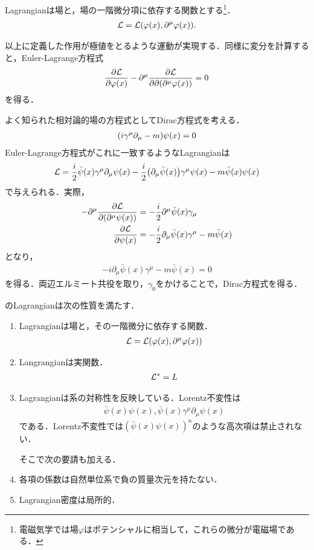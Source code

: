 	Lagrangianは場と，場の一階微分項に依存する関数とする\footnote{電磁気学では場$\varphi$はポテンシャルに相当して，これらの微分が電磁場である．}．
	\begin{align}
			\mathcal{L} = \mathcal{L}(\varphi(x), \partial^{\mu}\varphi(x)).
	\end{align}

	以上に定義した作用が極値をとるような運動が実現する．同様に変分を計算すると，Euler-Lagrange方程式
	\begin{align}
			\pdv{\mathcal{L}}{\varphi(x)} - \partial^{\mu}\pdv{\mathcal{L}}{\partial (\partial^{\mu}\varphi(x))} = 0
	\end{align}
	を得る．
	\begin{eg}[Dirac方程式]
			よく知られた相対論的場の方程式としてDirac方程式を考える．
			\begin{align}
			\qty(i\gamma^{\mu}\partial_{\mu} - m)\psi(x) = 0
			\end{align}
			Euler-Lagrange方程式がこれに一致するようなLagrangianは
			\begin{align}
					\mathcal{L} = \frac{i}{2}\bar{\psi}(x)\gamma^{\mu}\partial_{\mu}\psi(x) - \frac{i}{2}\qty(\partial_{\mu}\bar{\psi}(x))\gamma^{\mu}\psi(x) - m\bar{\psi}(x)\psi(x) \label{Dirac_L}
			\end{align}
			で与えられる．実際，
			\begin{align}
					-\partial ^{\mu}\pdv{\mathcal{L}}{(\partial^{\mu}\psi(x))} &= -\frac{i}{2}\partial^{\mu}\bar{\psi}(x)\gamma_{\mu}\\
					\pdv{\mathcal{L}}{\psi(x)} &= -\frac{i}{2}\partial_{\mu}\bar{\psi}(x)\gamma^{\mu} - m\bar{\psi}(x)
			\end{align}
			となり，
			\begin{align}
					-i\partial_{\mu}\bar{\psi}(x)\gamma^{\mu} - m \bar{\psi}(x) = 0
			\end{align}
			を得る．両辺エルミート共役を取り，$\gamma_0$をかけることで，Dirac方程式を得る．

			のLagrangianは次の性質を満たす．
			\begin{enumerate}
					\item Lagrangianは場と，その一階微分に依存する関数．
							\begin{align}
									\mathcal{L} = \mathcal{L}(\varphi(x), \partial^{\mu}\varphi(x))
							\end{align}
					\item Langrangianは実関数．
							\begin{align}
									\mathcal{L}^{*} = L
							\end{align}
					\item Lagrangianは系の対称性を反映している．Lorentz不変性は
							\begin{align}
									\bar{\psi}(x)\psi(x), \bar{\psi}(x)\gamma^{\mu}\partial_{\mu}\psi(x)
							\end{align}
							である．Lorentz不変性では$(\bar{\psi}(x)\psi(x))^n$のような高次項は禁止されない．

							そこで次の要請も加える．

					\item 各項の係数は自然単位系で負の質量次元を持たない．
					\item Lagrangian密度は局所的．
			\end{enumerate}
	\end{eg}
